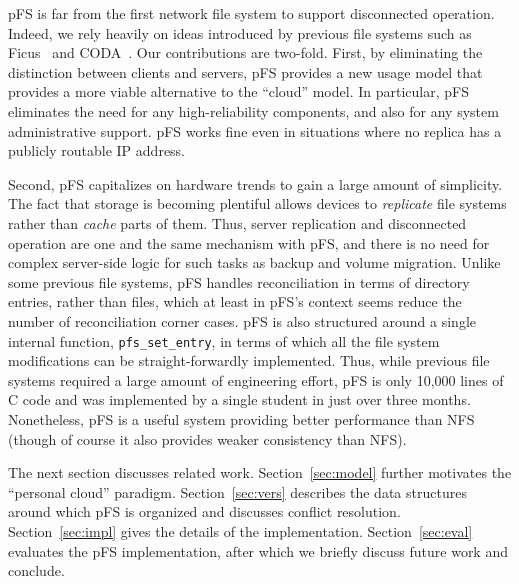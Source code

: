 pFS is far from the first network file system to support disconnected
operation.  Indeed, we rely heavily on ideas introduced by previous
file systems such as Ficus~\cite{page:ficus} and
CODA~\cite{kistler:coda}.  Our contributions are two-fold.  First, by
eliminating the distinction between clients and servers, pFS provides
a new usage model that provides a more viable alternative to the
``cloud'' model.  In particular, pFS eliminates the need for any
high-reliability components, and also for any system administrative
support.  pFS works fine even in situations where no replica has a
publicly routable IP address.

Second, pFS capitalizes on hardware trends to gain a large amount of
simplicity.  The fact that storage is becoming plentiful allows
devices to \emph{replicate} file systems rather than \emph{cache}
parts of them.  Thus, server replication and disconnected operation
are one and the same mechanism with pFS, and there is no need for
complex server-side logic for such tasks as backup and volume
migration.  Unlike some previous file systems, pFS handles
reconciliation in terms of directory entries, rather than files, which
at least in pFS's context seems reduce the number of reconciliation
corner cases.  pFS is also structured around a single internal
function, \texttt{pfs\_set\_entry}, in terms of which all the file
system modifications can be straight-forwardly implemented.  Thus,
while previous file systems required a large amount of engineering
effort, pFS is only 10,000 lines of C code and was implemented by a
single student in just over three months.  Nonetheless, pFS is a
useful system providing better performance than NFS (though of course
it also provides weaker consistency than NFS).

The next section discusses related work.  Section~\ref{sec:model}
further motivates the ``personal cloud'' paradigm.
Section~\ref{sec:vers} describes the data structures around which pFS
is organized and discusses conflict resolution.
Section~\ref{sec:impl} gives the details of the implementation.
Section~\ref{sec:eval} evaluates the pFS implementation, after which
we briefly discuss future work and conclude.


